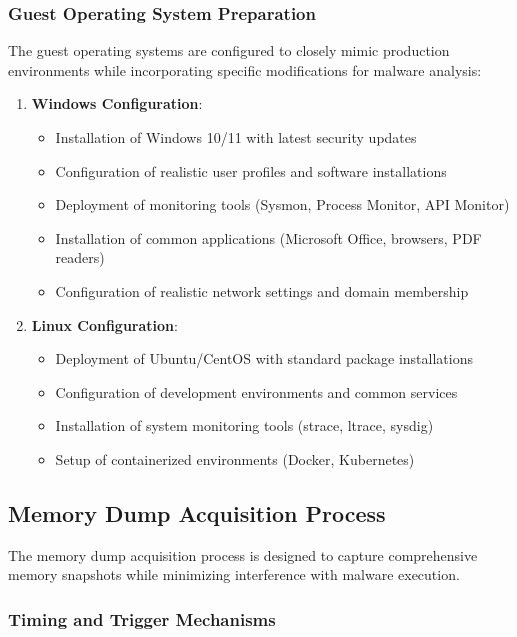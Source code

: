 \subsubsection{Guest Operating System Preparation}

The guest operating systems are configured to closely mimic production environments while incorporating specific modifications for malware analysis:

\begin{enumerate}
    \item \textbf{Windows Configuration}:
    \begin{itemize}
        \item Installation of Windows 10/11 with latest security updates
        \item Configuration of realistic user profiles and software installations
        \item Deployment of monitoring tools (Sysmon, Process Monitor, API Monitor)
        \item Installation of common applications (Microsoft Office, browsers, PDF readers)
        \item Configuration of realistic network settings and domain membership
    \end{itemize}
    
    \item \textbf{Linux Configuration}:
    \begin{itemize}
        \item Deployment of Ubuntu/CentOS with standard package installations
        \item Configuration of development environments and common services
        \item Installation of system monitoring tools (strace, ltrace, sysdig)
        \item Setup of containerized environments (Docker, Kubernetes)
    \end{itemize}
\end{enumerate}

\subsection{Memory Dump Acquisition Process}
\label{subsec:dump-acquisition}

The memory dump acquisition process is designed to capture comprehensive memory snapshots while minimizing interference with malware execution.

\subsubsection{Timing and Trigger Mechanisms}

